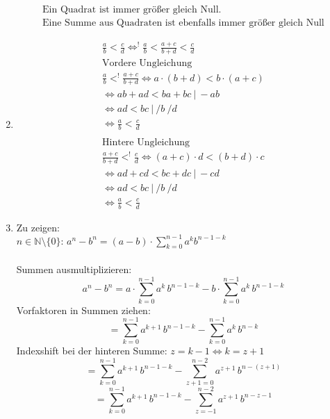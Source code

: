\documentclass{article}
\begin{document}
\begin{enumerate}[label = (\alph*)]
\begin{gather*}
                    \text{Ein Quadrat ist immer größer gleich Null.} \\
                    \text{Eine Summe aus Quadraten ist ebenfalls immer größer gleich Null}
                \end{gather*}
            \item 
                \begin{gather*}
                    \frac{a}{b} < \frac{c}{d} \Leftrightarrow^! \frac{a}{b} < \frac{a+c}{b+d} < \frac{c}{d} \\
                    \text{Vordere Ungleichung} \\
                    \frac{a}{b} <^! \frac{a+c}{b+d} \Leftrightarrow a \cdot (b + d) < b \cdot (a + c) \\
                    \Leftrightarrow ab + ad < ba + bc \: | \: - ab \\
                    \Leftrightarrow ad < bc \: | \: /b \: /d\\
                    \Leftrightarrow \frac{a}{b} < \frac{c}{d} \\
                    \\
                    \text{Hintere Ungleichung} \\
                    \frac{a+c}{b+d} <^! \frac{c}{d} \Leftrightarrow (a+c)\cdot d < (b+d)\cdot c \\
                    \Leftrightarrow ad + cd < bc + dc \: | \: -cd \\
                    \Leftrightarrow ad < bc \: | \: /b \: /d \\
                    \Leftrightarrow \frac{a}{b} < \frac{c}{d}
                \end{gather*}
            \item 
                Zu zeigen: \\
                $n \in \mathbb{N}  \setminus \{0\} :\, a^n - b^n = (a-b) \cdot \sum_{k=0}^{n-1} a^k b^{n-1-k} $ \\
                \\
                Summen ausmultiplizieren:
                $$ a^n-b^n = a \cdot \sum_{k=0}^{n-1} a^k \, b^{n-1-k} - b \cdot \sum_{k=0}^{n-1} a^k \, b^{n-1-k} $$
                Vorfaktoren in Summen ziehen: 
                $$ = \sum_{k=0}^{n-1} a^{k+1} \, b^{n-1-k} - \sum_{k=0}^{n-1} a^k \, b^{n-k} $$
                Indexshift bei der hinteren Summe: $z=k-1 \Leftrightarrow k=z+1$
                $$ = \sum_{k=0}^{n-1} a^{k+1} \, b^{n-1-k} - \sum_{z+1=0}^{n-2} a^{z+1} \, b^{n-(z+1)} $$
                $$ = \sum_{k=0}^{n-1} a^{k+1} \, b^{n-1-k} - \sum_{z=-1}^{n-2} a^{z+1} \, b^{n-z-1} $$

\end{enumerate}
\end{document}
